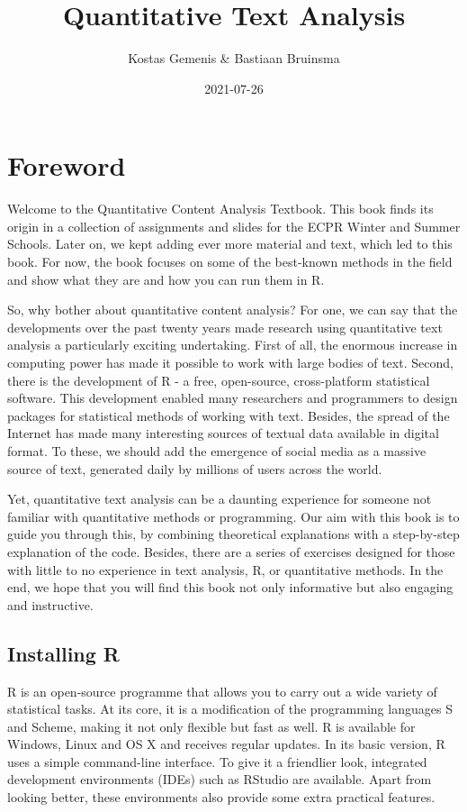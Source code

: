 \documentclass[
]{article}
\title{Quantitative Text Analysis}
\author{Kostas Gemenis \& Bastiaan Bruinsma}
\date{2021-07-26}
\begin{document}
\maketitle

{
\setcounter{tocdepth}{2}
\tableofcontents
}
\hypertarget{foreword}{%
\section{Foreword}\label{foreword}}

Welcome to the Quantitative Content Analysis Textbook. This book finds its origin in a collection of assignments and slides for the ECPR Winter and Summer Schools. Later on, we kept adding ever more material and text, which led to this book. For now, the book focuses on some of the best-known methods in the field and show what they are and how you can run them in R.

So, why bother about quantitative content analysis? For one, we can say that the developments over the past twenty years made research using quantitative text analysis a particularly exciting undertaking. First of all, the enormous increase in computing power has made it possible to work with large bodies of text. Second, there is the development of R - a free, open-source, cross-platform statistical software. This development enabled many researchers and programmers to design packages for statistical methods of working with text. Besides, the spread of the Internet has made many interesting sources of textual data available in digital format. To these, we should add the emergence of social media as a massive source of text, generated daily by millions of users across the world.

Yet, quantitative text analysis can be a daunting experience for someone not familiar with quantitative methods or programming. Our aim with this book is to guide you through this, by combining theoretical explanations with a step-by-step explanation of the code. Besides, there are a series of exercises designed for those with little to no experience in text analysis, R, or quantitative methods. In the end, we hope that you will find this book not only informative but also engaging and instructive.

\hypertarget{installing-r}{%
\subsection{Installing R}\label{installing-r}}

R is an open-source programme that allows you to carry out a wide variety of statistical tasks. At its core, it is a modification of the programming languages S and Scheme, making it not only flexible but fast as well. R is available for Windows, Linux and OS X and receives regular updates. In its basic version, R uses a simple command-line interface. To give it a friendlier look, integrated development environments (IDEs) such as RStudio are available. Apart from looking better, these environments also provide some extra practical features.
\end{document}
